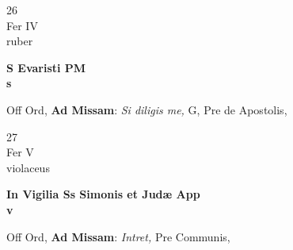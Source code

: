 \documentclass[10pt, openany]{book}
\begin{document}
        \begin{center}
            \begin{minipage}{3.5in}
                \vspace{2em}
                \begin{minipage}{0.5in}
                    {\Huge 26} \\
                    {\normalsize Fer IV} \\
                    {\normalsize ruber}
                \end{minipage}
                \begin{minipage}{3.0in}
                    \textbf{ \large S Evaristi PM \\
                    \textnormal{\normalsize s}} \\ 
                \end{minipage}
                \begin{justify}Off Ord, \textbf{Ad Missam}: \textit{Si diligis me,} G, Pre de Apostolis,  
                \end{justify}
            \end{minipage}
        \end{center}
    
        \begin{center}
            \begin{minipage}{3.5in}
                \vspace{2em}
                \begin{minipage}{0.5in}
                    {\Huge 27} \\
                    {\normalsize Fer V} \\
                    {\normalsize violaceus}
                \end{minipage}
                \begin{minipage}{3.0in}
                    \textbf{ \large In Vigilia Ss Simonis et Judæ App \\
                    \textnormal{\normalsize v}} \\ 
                \end{minipage}
                \begin{justify}Off Ord, \textbf{Ad Missam}: \textit{Intret,} Pre Communis,  
                \end{justify}
            \end{minipage}
        \end{center}
    
\end{document}
